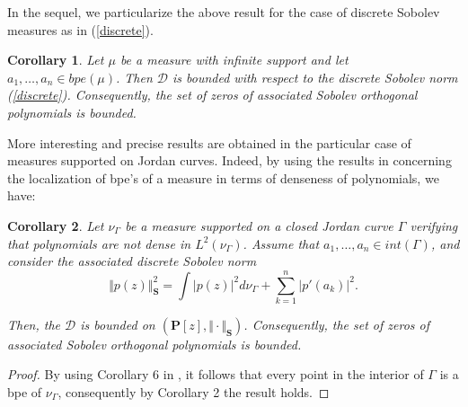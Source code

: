 \documentclass[12pt]{amsart}
\theoremstyle{definition}
\theoremstyle{plain}
\newtheorem{corollary}{Corollary}
\theoremstyle{remark}
\DeclareMathOperator{\CC}{\mathbb C}
\begin{document}


\noindent In the sequel, we particularize the  above result for the case of  discrete Sobolev measures as in (\ref{discrete}).  


\begin{corollary} Let $\mu$ be a measure with infinite support and let 
$a_1,\dots ,a_n\in bpe(\mu)$.  Then $\mathcal{D}$ is bounded with respect to the discrete Sobolev norm (\ref{discrete}). Consequently, the set of zeros of associated Sobolev orthogonal polynomials is bounded.
\end{corollary}
\noindent  More interesting and precise results are obtained in the particular case of measures supported on Jordan curves. Indeed, by using the results in \cite{EGT5} concerning the localization of bpe's of a measure in terms of denseness of polynomials, we have:

\begin{corollary} Let $\nu_{\Gamma}$ be a measure supported on a  closed  Jordan curve $\Gamma$ verifying  that polynomials are not dense in %
$L^{2}(\nu_{\Gamma})$. Assume that  $a_1,\dots,a_{n} \in int(\Gamma)$, and consider  the associated  discrete Sobolev norm
$$
\Vert p(z) \Vert^2_{\mathbf{S}}= \int \vert p(z) \vert^{2}d\nu_{\Gamma} + \sum_{k=1}^{n} \vert p'(a_k)\vert^{2}.
$$

\noindent Then, the  $\mathcal{D}$  is bounded on $(\mathbf{P}[z],\Vert \cdot \Vert_{\mathbf{S}})$. Consequently, the set of zeros of associated Sobolev orthogonal polynomials is bounded.

\end{corollary} 
\begin{proof} By using  Corollary 6 in  \cite{EGT5}, it follows that every point in the interior of $\Gamma$ is a bpe of $\nu_{\Gamma}$, consequently by Corollary 2 the result holds. 

\end{proof} 
\end{document}
